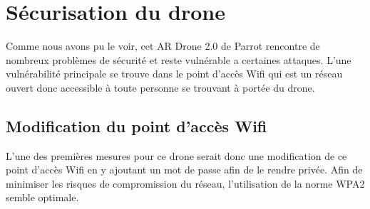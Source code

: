 \section{Sécurisation du drone}
Comme nous avons pu le voir, cet AR Drone 2.0 de Parrot rencontre de nombreux problèmes de sécurité et reste vulnérable a certaines attaques. L'une vulnérabilité principale se trouve dans le point d'accès Wifi qui est un réseau ouvert donc accessible à toute personne se trouvant à portée du drone.

\subsection{Modification du point d'accès Wifi}
L'une des premières mesures pour ce drone serait donc une modification de ce point d'accès Wifi en y ajoutant un mot de passe afin de le rendre privée. Afin de minimiser les risques de compromission du réseau, l'utilisation de la norme WPA2 semble optimale.
